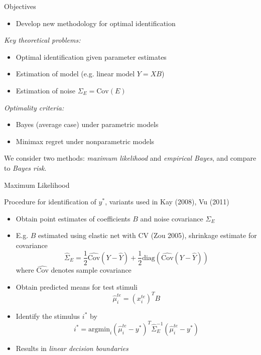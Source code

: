 \documentclass[final]{beamer}
\newlength{\onecolwid}
\begin{document}
\begin{frame}[t]
\begin{columns}[t]
\begin{column}{\onecolwid}
\begin{block}{Objectives}
\begin{itemize}
\item Develop new methodology for optimal identification
\end{itemize}

\emph{Key theoretical problems:}
\begin{itemize}
\item Optimal identification given parameter estimates
\item Estimation of model (e.g. linear model $Y = XB$)
\item Estimation of noise $\Sigma_E = \text{Cov}(E)$
\end{itemize}

\emph{Optimality criteria:}
\begin{itemize}
\item Bayes (average case) under parametric models
\item Minimax regret under nonparametric models
\end{itemize}

We consider two methods: \emph{maximum likelihood} and \emph{empirical
  Bayes}, and compare to \emph{Bayes risk}.
\end{block}



\begin{block}{Maximum Likelihood}

Procedure for identification of $y^*$,
variants used in Kay (2008), Vu (2011)

\begin{itemize}
\item Obtain point estimates of coefficients $B$ and noise covariance $\Sigma_E$
\item E.g. $B$ estimated using elastic net with CV (Zou 2005),
shrinkage estimate for covariance
\[
\hat{\Sigma}_E = \frac{1}{2}\hat{\text{Cov}}(Y - \hat{Y}) + \frac{1}{2}\text{diag}(\hat{\text{Cov}}(Y - \hat{Y}))
\]
where $\hat{\text{Cov}}$ denotes sample covariance
\item Obtain predicted means for test stimuli
\[
\hat{\mu}_i^{te} = (x_i^{te})^T B
\]
\item Identify the stimulus $i^*$ by
\[
i^* = \text{argmin}_{i} (\hat{\mu}_i^{te} - y^*)^T \hat{\Sigma}_E^{-1} (\hat{\mu}_i^{te} - y^*)
\]
\item Results in \emph{linear decision boundaries}
\end{itemize}


\end{block}
\end{column}
\end{columns}
\end{frame}
\end{document}
